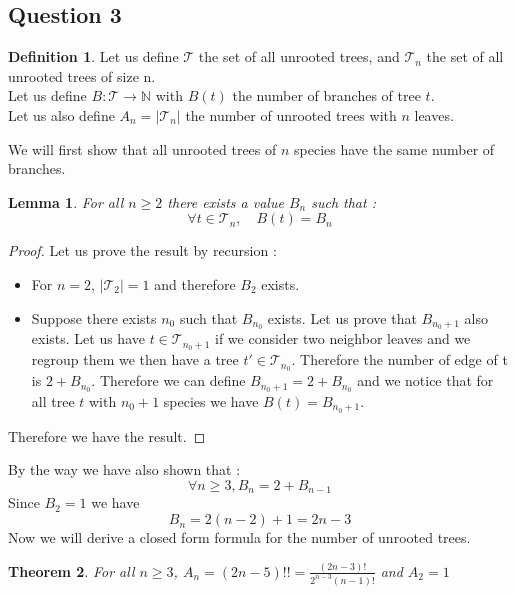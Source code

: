 \documentclass[]{article}
\newtheorem{theorem}{Theorem}[section]
\newtheorem{lemma}[theorem]{Lemma}
\theoremstyle{definition}
\newtheorem{definition}{Definition}[section]
\begin{document}
\subsection{Question 3}
\begin{definition}
	Let us define $\mathcal{T}$ the set of all unrooted trees, and $\mathcal{T}_{n}$ the set of all unrooted trees of size n.\\
	Let us define $B : \mathcal{T} \rightarrow \mathbb{N}$ with $B(t)$ the number of branches of tree $t$.\\
	Let us also define $A_{n} = |\mathcal{T}_{n}|$ the number of unrooted trees with $n$ leaves.
\end{definition}
We will first show that all unrooted trees of $n$ species have the same number of branches.
\begin{lemma}
	For all $n\geq2$ there exists a value $B_{n}$ such that :\\
	\begin{equation*}
	\forall t \in \mathcal{T}_{n}, \quad B(t) = B_{n}
	\end{equation*}
\end{lemma}
\begin{proof}
	Let us prove the result by recursion :
	\begin{itemize}
	\item For $n = 2$, $|\mathcal{T}_{2}| = 1$ and therefore $B_{2}$ exists.\\
	\item Suppose there exists $n_{0}$ such that $B_{n_{0}}$ exists. Let us prove that $B_{n_{0} + 1}$ also exists.
	Let us have $t \in \mathcal{T}_{n_{0} + 1}$ if we consider two neighbor leaves and we regroup them we then have a tree $t' \in \mathcal{T}_{n_{0}}$. Therefore the number of edge of t is $2 + B_{n_{0}}$. Therefore we can define $B_{n_{0}+1} = 2 +  B_{n_{0}}$ and we notice that for all tree $t$ with $n_{0} + 1$ species we have $B(t) = B_{n_{0} + 1}$.
	\end{itemize}
	Therefore we have the result.
\end{proof}
By the way we have also shown that :
\begin{equation*}
	\forall n \geq 3, B_{n} = 2 + B_{n-1}
\end{equation*}
Since $B_{2} = 1$ we have $$B_{n} = 2(n-2) + 1 = 2n - 3$$
Now we will derive a closed form formula for the number of unrooted trees.
\begin{theorem}
	For all $n\geq 3$, $A_{n} = (2n-5)!! = \frac{(2n-3)!}{2^{n-3}(n-1)!}$ and $A_{2} = 1$
\end{theorem}
\end{document}
